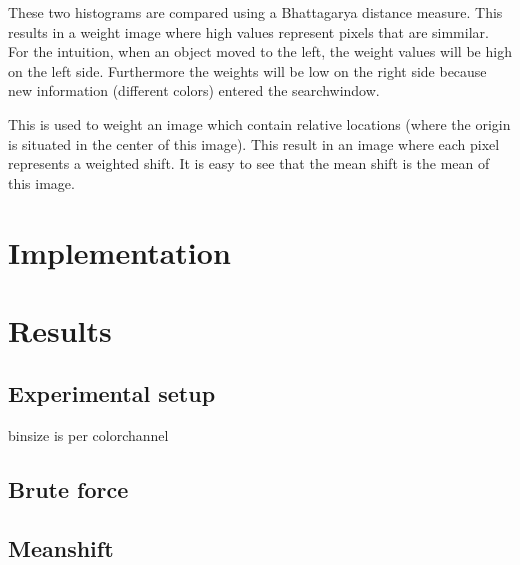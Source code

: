\documentclass[a4paper,11pt]{article}
\begin{document}
		These two histograms are compared using a Bhattagarya distance measure. This
		results in a weight image where high values represent pixels that are
		simmilar.  For the intuition, when an object moved to the left, the weight
		values will be high on the left side. Furthermore the weights will be low on
		the right side because new information (different colors) entered the
		searchwindow. 

		This is used to weight an image which contain relative locations
		(where the origin is situated in the center of this image). This result in
		an image where each pixel represents a weighted shift. It is easy to see
		that the mean shift is the mean of this image.
	




\section{Implementation}

\section{Results} 
	\subsection{Experimental setup} 
	binsize is per colorchannel
	\subsection{Brute force} 
	\subsection{Meanshift} 
\end{document}
